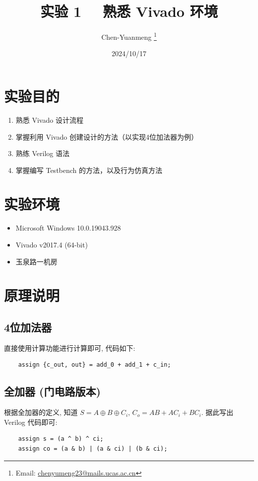 \documentclass{article}
\title{实验 1 \ \ 熟悉 Vivado 环境}
\author{Chen-Yuanmeng \thanks{Email: \url{chenyumeng23@mails.ucas.ac.cn}}}
\date{2024/10/17}
\providecommand{\tightlist}{\setlength{\itemsep}{0pt}\setlength{\parskip}{0pt}}
\begin{document}
\maketitle

\section{实验目的}

\begin{enumerate}\tightlist
    \item 熟悉 Vivado 设计流程
    \item 掌握利用 Vivado 创建设计的方法（以实现4位加法器为例）
    \item 熟练 Verilog 语法
    \item 掌握编写 Testbench 的方法，以及行为仿真方法
\end{enumerate}

\section{实验环境}

\begin{itemize}\tightlist
    \item Microsoft Windows 10.0.19043.928
    \item Vivado v2017.4 (64-bit)
    \item 玉泉路一机房
\end{itemize}

\section{原理说明}

\subsection{4位加法器}

直接使用计算功能进行计算即可, 代码如下:
\begin{lstlisting}
    assign {c_out, out} = add_0 + add_1 + c_in;
\end{lstlisting}

\subsection{全加器 (门电路版本)}

根据全加器的定义, 知道 \(S = A \oplus B \oplus C_i\), \(C_o = AB + AC_i + BC_i\). 据此写出 Verilog 代码即可:
\begin{lstlisting}
    assign s = (a ^ b) ^ ci;
    assign co = (a & b) | (a & ci) | (b & ci);
\end{lstlisting}
\end{document}
